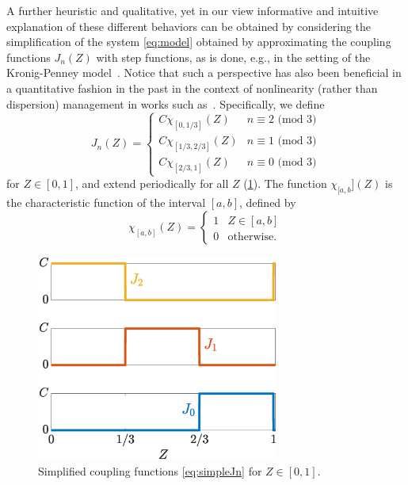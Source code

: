 \documentclass[reprint, amsmath,amssymb,aps,pre]{revtex4-2}
\begin{document}
A further heuristic and qualitative, yet in our view informative and intuitive explanation of these different behaviors can be obtained by considering the simplification of the system \cref{eq:model} obtained by approximating the coupling functions $J_n(Z)$ with step functions, as is done, e.g.,
in the setting of the Kronig-Penney model~\cite{kronig}. 
Notice that such a perspective has also been beneficial in
a quantitative
fashion in the past in the context of nonlinearity (rather than dispersion)
management in works such as~\cite{PhysRevLett.97.033903,PhysRevLett.97.234101}.
Specifically, we define %
\begin{equation}\label{eq:simpleJn}
J_n(Z) = \begin{cases}
C\chi_{[0,1/3]}(Z) & n \equiv 2 \text{ (mod 3)} \\
C\chi_{[1/3,2/3]}(Z) & n \equiv 1 \text{ (mod 3)}\\
C\chi_{[2/3,1]}(Z) & n \equiv 0 \text{ (mod 3)}
\end{cases}
\end{equation}
for $Z \in [0,1]$, and extend periodically for all $Z$ (\cref{fig:Jsimple}). The function $\chi_{[a,b}](Z)$ is the characteristic function of the interval $[a,b]$, defined by
\[
\chi_{[a,b]}(Z) = \begin{cases}
1 & Z \in [a,b] \\
0 & \text{otherwise}.
\end{cases}
\]
\begin{figure}
    \centering
    \includegraphics[width=8cm]{Jsimple.eps}
    \caption{Simplified coupling functions \cref{eq:simpleJn} for $Z \in [0,1]$.}
    \label{fig:Jsimple}
\end{figure}
\end{document}
